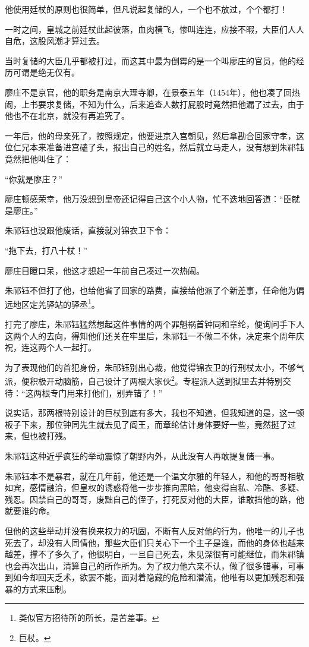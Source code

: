 \begin{multicols}{\theparacolNo}
他使用廷杖的原则也很简单，但凡说起复储的人，一个也不放过，个个都打！

一时之间，皇城之前廷杖此起彼落，血肉横飞，惨叫连连，应接不暇，大臣们人人自危，这股风潮才算过去。

当时复储的大臣几乎都被打过，而这其中最为倒霉的是一个叫廖庄的官员，他的经历可谓是绝无仅有。

廖庄不是京官，他的职务是南京大理寺卿，在景泰五年（1454年），他也凑了回热闹，上书要求复储，不知为什么，后来追查人数打屁股时竟然把他漏了过去，由于他也不在北京，就没有再追究了。

一年后，他的母亲死了，按照规定，他要进京入宫朝见，然后拿勘合回家守孝，这位仁兄本来准备进宫磕了头，报出自己的姓名，然后就立马走人，没有想到朱祁钰竟然把他叫住了：

“你就是廖庄？”

廖庄顿感荣幸，他万没想到皇帝还记得自己这个小人物，忙不迭地回答道：“臣就是廖庄。”

朱祁钰也没跟他废话，直接就对锦衣卫下令：

“拖下去，打八十杖！”

廖庄目瞪口呆，他这才想起一年前自己凑过一次热闹。

朱祁钰不但打了他，也给他省了回家的路费，直接给他派了个新差事，任命他为偏远地区定羌驿站的驿丞\footnote{类似官方招待所的所长，是苦差事。}。

打完了廖庄，朱祁钰猛然想起这件事情的两个罪魁祸首钟同和章纶，便询问手下人这两个人的去向，得知他们还关在牢里后，朱祁钰一不做二不休，决定来个周年庆祝，连这两个人一起打。

为了表现他们的首犯身份，朱祁钰别出心裁，他觉得锦衣卫的行刑杖太小，不够气派，便积极开动脑筋，自己设计了两根大家伙\footnote{巨杖。}。专程派人送到狱里去并特别交待：“这两根专门用来打他们，别弄错了！”

说实话，那两根特别设计的巨杖到底有多大，我也不知道，但我知道的是，这一顿板子下来，那位钟同先生就去见了阎王，而章纶估计身体要好一些，竟然挺了过来，但也被打残。

朱祁钰这种近乎疯狂的举动震惊了朝野内外，从此没有人再敢提复储一事。

朱祁钰本不是暴君，就在几年前，他还是一个温文尔雅的年轻人，和他的哥哥相敬如宾，感情融洽，但皇权的诱惑将他一步步推向黑暗，他变得自私、冷酷、多疑、残忍。囚禁自己的哥哥，废黜自己的侄子，打死反对他的大臣，谁敢挡他的路，他就要谁的命。

但他的这些举动并没有换来权力的巩固，不断有人反对他的行为，他唯一的儿子也死去了，却没有人同情他，那些大臣们只关心下一个主子是谁，而他的身体也越来越差，撑不了多久了，他很明白，一旦自己死去，朱见深很有可能继位，而朱祁镇也会再次出山，清算自己的所作所为。为了权力他六亲不认，做了很多错事，可事到如今却回天乏术，欲罢不能，面对着隐藏的危险和潜流，他唯有以更加残忍和强暴的方式来压制。


\end{multicols}
